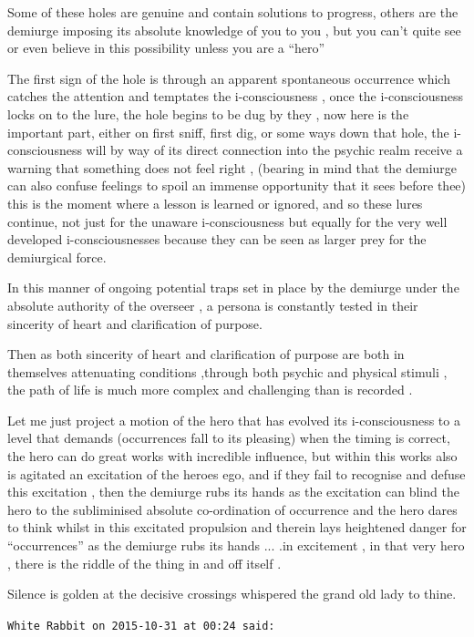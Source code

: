 \begin{footnotesize}
\begin{sffamily}
Some of these holes are genuine and contain solutions to progress, others are the demiurge imposing its absolute knowledge of you to you , but you can't quite see or even believe in this possibility unless you are a ``hero''

The first sign of the hole is through an apparent spontaneous occurrence which catches the attention and temptates the i-consciousness , once the i-consciousness locks on to the lure, the hole begins to be dug by they , now here is the important part, either on first sniff, first dig, or some ways down that hole, the i-consciousness will by way of its direct connection into the psychic realm receive a warning that something does not feel right , (bearing in mind that the demiurge can also confuse feelings to spoil an immense opportunity that it sees before thee) this is the moment where a lesson is learned or ignored, and so these lures continue, not just for the unaware i-consciousness but equally for the very well developed i-consciousnesses because they can be seen as larger prey for the demiurgical force.

In this manner of ongoing potential traps set in place by the demiurge under the absolute authority of the overseer , a persona is constantly tested in their sincerity of heart and clarification of purpose.

Then as both sincerity of heart and clarification of purpose are both in themselves attenuating conditions ,through both psychic and physical stimuli , the path of life is much more complex and challenging than is recorded .

Let me just project a motion of the hero that has evolved its i-consciousness to a level that demands (occurrences fall to its pleasing) when the timing is correct, the hero can do great works with incredible influence, but within this works also is agitated an excitation of the heroes ego, and if they fail to recognise and defuse this excitation , then the demiurge rubs its hands as the excitation can blind the hero to the subliminised absolute co-ordination of occurrence and the hero dares to think whilst in this excitated propulsion and therein lays heightened danger for ``occurrences'' as the demiurge rubs its hands ... .in excitement , in that very hero , there is the riddle of the thing in and off itself .

Silence is golden at the decisive crossings whispered the grand old lady to thine.

\hfill

\texttt{White Rabbit on 2015-10-31 at 00:24 said:}


\end{sffamily}
\end{footnotesize}
